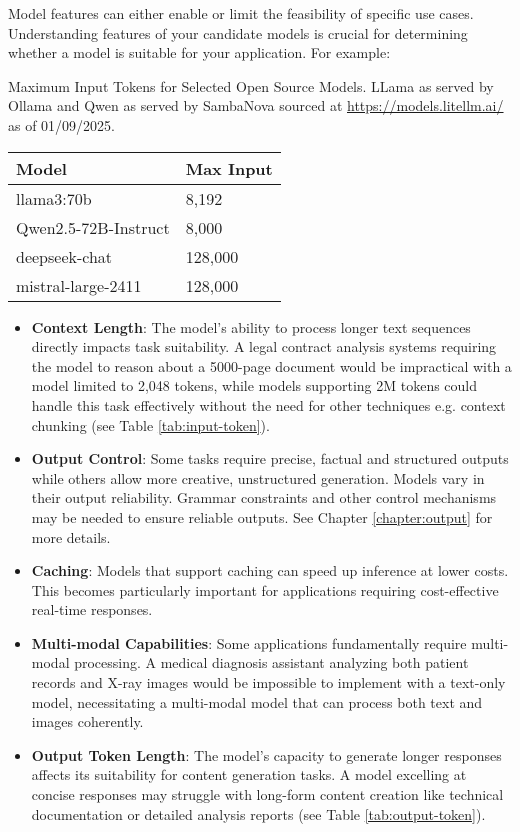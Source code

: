 Model features can either enable or limit the feasibility of specific use cases. Understanding features of your candidate models is crucial for determining whether a model is suitable for your application. For example:
\begin{margintable}[*3]
\caption{Maximum Input Tokens for Selected Open Source Models. LLama as served by Ollama and Qwen as served by SambaNova sourced at \url{https://models.litellm.ai/} as of 01/09/2025.}
\begin{tabular}{ll}
\hline
Model & Max Input \\
\hline
llama3:70b & 8,192 \\
Qwen2.5-72B-Instruct & 8,000 \\
deepseek-chat & 128,000 \\
mistral-large-2411 & 128,000 \\
\hline
\end{tabular}
\label{tab:input-token}
\end{margintable}
\begin{itemize}
    \item \textbf{Context Length}: The model's ability to process longer text sequences directly impacts task suitability. A legal contract analysis systems requiring the model to reason about a 5000-page document would be impractical with a model limited to 2,048 tokens, while models supporting 2M tokens could handle this task effectively without the need for other techniques e.g. context chunking (see Table \ref{tab:input-token}).

    \item \textbf{Output Control}: Some tasks require precise, factual and structured outputs while others allow more creative, unstructured generation. Models vary in their output reliability. Grammar constraints and other control mechanisms may be needed to ensure reliable outputs. See Chapter \ref{chapter:output} for more details.

    \item \textbf{Caching}: Models that support caching can speed up inference at lower costs. This becomes particularly important for applications requiring cost-effective real-time responses.

    \item \textbf{Multi-modal Capabilities}: Some applications fundamentally require multi-modal processing. A medical diagnosis assistant analyzing both patient records and X-ray images would be impossible to implement with a text-only model, necessitating a multi-modal model that can process both text and images coherently.

    \item \textbf{Output Token Length}: The model's capacity to generate longer responses affects its suitability for content generation tasks. A model excelling at concise responses may struggle with long-form content creation like technical documentation or detailed analysis reports (see Table \ref{tab:output-token}).
\end{itemize}


